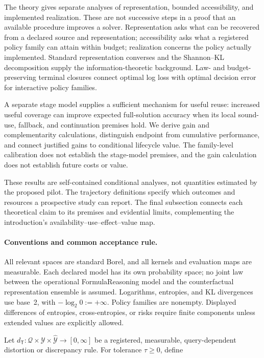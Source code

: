 \documentclass[10pt]{article} %
\providecommand{\1}{\mathbf{1}}  %
\theoremstyle{remark}
\theoremstyle{definition}
\begin{document}
The theory gives separate analyses of representation, bounded
accessibility, and implemented realization. These are not successive steps
in a proof that an available procedure improves a solver. Representation
asks what can be recovered from a declared source and representation;
accessibility asks what a registered policy family can attain within
budget; realization concerns the policy actually implemented. Standard
representation converses and the Shannon--KL decomposition supply the
information-theoretic background. Law- and budget-preserving terminal
closures connect optimal log loss with optimal decision error for
interactive policy families.

A separate stage model supplies a sufficient mechanism for useful reuse:
increased useful coverage can improve expected full-solution accuracy when
its local sound-use, fallback, and continuation premises hold. We derive
gain and complementarity calculations, distinguish endpoint from cumulative
performance, and connect justified gains to conditional lifecycle value.
The family-level calibration does not establish the stage-model premises,
and the gain calculation does not establish future costs or value.

These results are self-contained conditional analyses, not quantities
estimated by the proposed pilot. The trajectory definitions specify which
outcomes and resources a prospective study can report. The final
subsection connects each theoretical claim to its premises and evidential
limits, complementing the introduction's availability--use--effect--value
map.

\paragraph{Conventions and common acceptance rule.}

All relevant spaces are standard Borel, and all kernels and evaluation
maps are measurable. Each declared model has its own probability space;
no joint law between the operational FormulaReasoning model and the
counterfactual representation ensemble is assumed. Logarithms, entropies,
and KL divergences use base~2, with $-\log_2 0:=+\infty$. Policy families
are nonempty. Displayed differences of entropies, cross-entropies, or
risks require finite components unless extended values are explicitly
allowed.

Let $d_{\mathsf T}:\mathcal Q\times\mathcal Y\times\widehat{\mathcal Y}\to[0,\infty]$ be a registered, measurable, query-dependent distortion or discrepancy rule. For tolerance $\tau\geq0$, define
\end{document}
